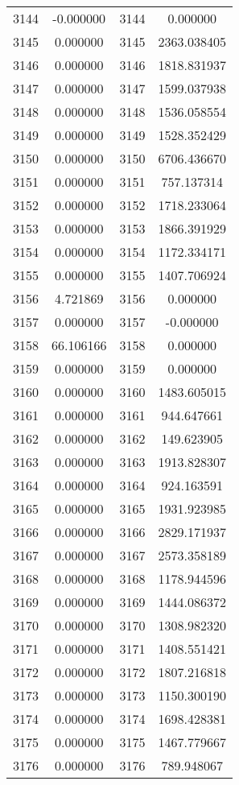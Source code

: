 \documentclass[12pt]{article}
\begin{document}
\begin{longtable}{@{}cccc@{}}
3144 & -0.000000 & 3144 & 0.000000 \\
3145 & 0.000000 & 3145 & 2363.038405 \\
3146 & 0.000000 & 3146 & 1818.831937 \\
3147 & 0.000000 & 3147 & 1599.037938 \\
3148 & 0.000000 & 3148 & 1536.058554 \\
3149 & 0.000000 & 3149 & 1528.352429 \\
3150 & 0.000000 & 3150 & 6706.436670 \\
3151 & 0.000000 & 3151 & 757.137314 \\
3152 & 0.000000 & 3152 & 1718.233064 \\
3153 & 0.000000 & 3153 & 1866.391929 \\
3154 & 0.000000 & 3154 & 1172.334171 \\
3155 & 0.000000 & 3155 & 1407.706924 \\
3156 & 4.721869 & 3156 & 0.000000 \\
3157 & 0.000000 & 3157 & -0.000000 \\
3158 & 66.106166 & 3158 & 0.000000 \\
3159 & 0.000000 & 3159 & 0.000000 \\
3160 & 0.000000 & 3160 & 1483.605015 \\
3161 & 0.000000 & 3161 & 944.647661 \\
3162 & 0.000000 & 3162 & 149.623905 \\
3163 & 0.000000 & 3163 & 1913.828307 \\
3164 & 0.000000 & 3164 & 924.163591 \\
3165 & 0.000000 & 3165 & 1931.923985 \\
3166 & 0.000000 & 3166 & 2829.171937 \\
3167 & 0.000000 & 3167 & 2573.358189 \\
3168 & 0.000000 & 3168 & 1178.944596 \\
3169 & 0.000000 & 3169 & 1444.086372 \\
3170 & 0.000000 & 3170 & 1308.982320 \\
3171 & 0.000000 & 3171 & 1408.551421 \\
3172 & 0.000000 & 3172 & 1807.216818 \\
3173 & 0.000000 & 3173 & 1150.300190 \\
3174 & 0.000000 & 3174 & 1698.428381 \\
3175 & 0.000000 & 3175 & 1467.779667 \\
3176 & 0.000000 & 3176 & 789.948067 \\

\end{longtable}
\end{document}
